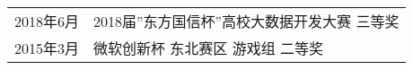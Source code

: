 %
%


\begin{tabular}{rl}	
	2018年6月 & 2018届”东方国信杯”高校大数据开发大赛 三等奖 \\
	2015年3月 &  微软创新杯 东北赛区 游戏组 二等奖
\end{tabular}